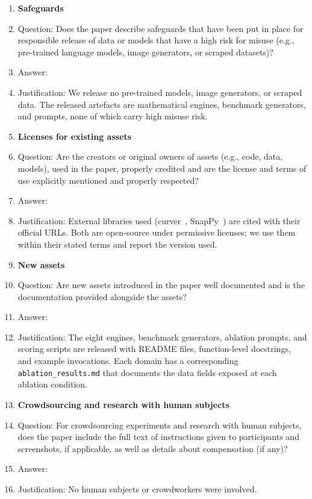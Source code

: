 \begin{enumerate}
\item {\bf Safeguards}
    \item[] Question: Does the paper describe safeguards that have been put in place for responsible release of data or models that have a high risk for misuse (e.g., pre-trained language models, image generators, or scraped datasets)?
    \item[] Answer: \answerNA{}
    \item[] Justification: We release no pre-trained models, image generators, or scraped data. The released artefacts are mathematical engines, benchmark generators, and prompts, none of which carry high misuse risk.

\item {\bf Licenses for existing assets}
    \item[] Question: Are the creators or original owners of assets (e.g., code, data, models), used in the paper, properly credited and are the license and terms of use explicitly mentioned and properly respected?
    \item[] Answer: \answerYes{}
    \item[] Justification: External libraries used (curver~\citep{bell2016curver}, SnapPy~\citep{snappy}) are cited with their official URLs. Both are open-source under permissive licenses; we use them within their stated terms and report the version used.

\item {\bf New assets}
    \item[] Question: Are new assets introduced in the paper well documented and is the documentation provided alongside the assets?
    \item[] Answer: \answerYes{}
    \item[] Justification: The eight engines, benchmark generators, ablation prompts, and scoring scripts are released with README files, function-level docstrings, and example invocations. Each domain has a corresponding \texttt{ablation\_results.md} that documents the data fields exposed at each ablation condition.

\item {\bf Crowdsourcing and research with human subjects}
    \item[] Question: For crowdsourcing experiments and research with human subjects, does the paper include the full text of instructions given to participants and screenshots, if applicable, as well as details about compensation (if any)?
    \item[] Answer: \answerNA{}
    \item[] Justification: No human subjects or crowdworkers were involved.


\end{enumerate}
